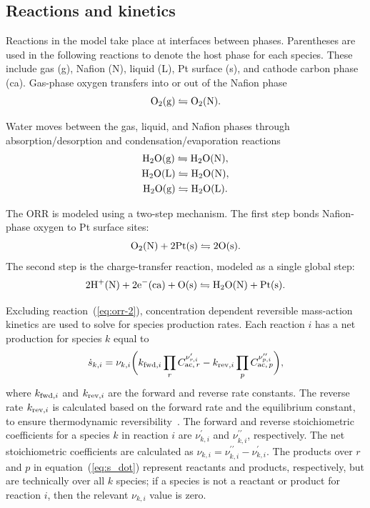 \documentclass[final,3p,times,twocolumn]{elsarticle}    %
\begin{document}
\subsection{Reactions and kinetics}
\label{sect:kinetics}
Reactions in the model take place at interfaces between phases. Parentheses are used in the following reactions to denote the host phase for each species. These include gas (g), Nafion (N), liquid (L), Pt surface (s), and cathode carbon phase (ca). Gas-phase oxygen transfers into or out of the Nafion phase
\begin{equation} \label{eq:o2-gn}
    {\rm O_2(g) \leftrightharpoons O_2(N).}
\end{equation}

Water moves between the gas, liquid, and Nafion phases through absorption/desorption and condensation/evaporation reactions
\begin{gather}
    {\rm H_2O(g) \leftrightharpoons H_2O(N),} \label{eq:h2o-gn} \\
    {\rm H_2O(L) \leftrightharpoons H_2O(N),} \label{eq:h2o-wn} \\
    {\rm H_2O(g) \leftrightharpoons H_2O(L).} \label{eq:h2o-gw}
\end{gather}

The ORR is modeled using a two-step mechanism. The first step bonds Nafion-phase oxygen to Pt surface sites: 
\begin{equation} \label{eq:orr-1}
    {\rm O_2(N) + 2Pt(s) \leftrightharpoons 2O(s).} 
\end{equation}
The second step is the charge-transfer reaction, modeled as a single global step:
\begin{equation} \label{eq:orr-2}
    {\rm 2H^{+}(N) + 2e^{-}(ca) + O(s) \leftrightharpoons H_2O(N) + Pt(s).} 
\end{equation}

Excluding reaction~(\ref{eq:orr-2}), concentration dependent reversible mass-action kinetics are used to solve for species production rates. Each reaction $i$ has a net production for species $k$ equal to
\begin{equation} \label{eq:s_dot}
    \dot{s}_{k,i} = \nu_{k,i} \bigg( k_{{\rm fwd},i} \prod_{r} C_{{\rm ac},\,r}^{\nu_{r,i}^{\prime}} 
                  - k_{{\rm rev},i} \prod_{p} C_{{\rm ac},\,p}^{\nu_{p,i}^{\prime \prime}} \bigg), 
\end{equation}
where $k_{{\rm fwd},i}$ and $k_{{\rm rev},i}$ are the forward and reverse rate constants. The reverse rate $k_{{\rm rev},i}$ is calculated based on the forward rate and the equilibrium constant, to ensure thermodynamic reversibility~\cite{bib:decaluwe_weddle_2018}. The forward and reverse stoichiometric coefficients for a species $k$ in reaction $i$ are $\nu_{k,i}^{\prime}$ and $\nu_{k,i}^{\prime \prime}$, respectively. The net stoichiometric coefficients are calculated as $\nu_{k,i} = \nu_{k,i}^{\prime \prime} - \nu_{k,i}^{\prime}$. The products over $r$ and $p$ in equation~(\ref{eq:s_dot}) represent reactants and products, respectively, but are technically over all $k$ species; if a species is not a reactant or product for reaction $i$, then the relevant $\nu_{k,i}$ value is zero.
\end{document}
